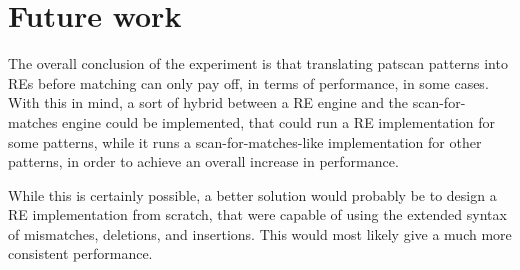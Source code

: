 \documentclass[12pt]{article}
\theoremstyle{definition}
\begin{document}
\section{Future work}

The overall conclusion of the experiment is that translating patscan patterns into REs before matching can only pay off, in terms of performance, in some cases. With this in mind, a sort of hybrid between a RE engine and the scan-for-matches engine could be implemented, that could run a RE implementation for some patterns, while it runs a scan-for-matches-like implementation for other patterns, in order to achieve an overall increase in performance.

While this is certainly possible, a better solution would probably be to design a RE implementation from scratch, that were capable of using the extended syntax of mismatches, deletions, and insertions. This would most likely give a much more consistent performance.


\newpage


\nocite{*}

\end{document}
